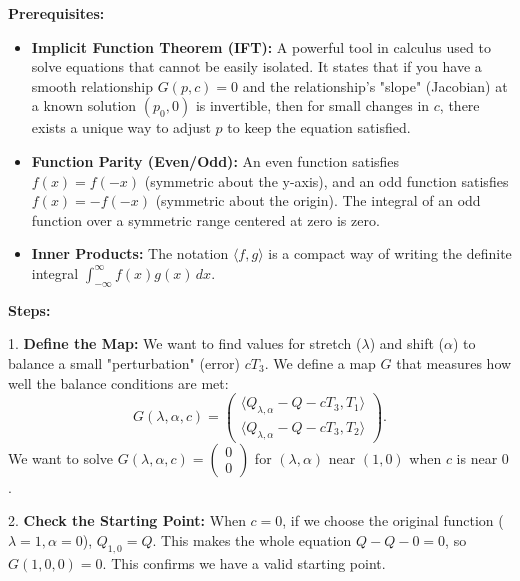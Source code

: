 \begin{solution}
\textbf{Prerequisites:}
\begin{itemize}
    \item \textbf{Implicit Function Theorem (IFT):} A powerful tool in calculus used to solve equations that cannot be easily isolated. It states that if you have a smooth relationship $G(p, c) = 0$ and the relationship's "slope" (Jacobian) at a known solution $(p_0, 0)$ is invertible, then for small changes in $c$, there exists a unique way to adjust $p$ to keep the equation satisfied.
    \item \textbf{Function Parity (Even/Odd):} An even function satisfies $f(x) = f(-x)$ (symmetric about the y-axis), and an odd function satisfies $f(x) = -f(-x)$ (symmetric about the origin). The integral of an odd function over a symmetric range centered at zero is zero.
    \item \textbf{Inner Products:} The notation $\langle f, g \rangle$ is a compact way of writing the definite integral $\int_{-\infty}^{\infty} f(x)g(x) \, dx$.
\end{itemize}

\textbf{Steps:}

\par\vspace{\baselineskip}
1. \textbf{Define the Map:} We want to find values for stretch ($\lambda$) and shift ($\alpha$) to balance a small "perturbation" (error) $cT_3$. We define a map $G$ that measures how well the balance conditions are met:
\[
G(\lambda, \alpha, c) = \begin{pmatrix} \langle Q_{\lambda,\alpha} - Q - cT_3, T_1 \rangle \\ \langle Q_{\lambda,\alpha} - Q - cT_3, T_2 \rangle \end{pmatrix}.
\]
We want to solve $G(\lambda, \alpha, c) = \begin{pmatrix} 0 \\ 0 \end{pmatrix}$ for $(\lambda, \alpha)$ near $(1, 0)$ when $c$ is near $0$.

\par\vspace{\baselineskip}
2. \textbf{Check the Starting Point:} When $c=0$, if we choose the original function ($\lambda=1, \alpha=0$), $Q_{1,0} = Q$. This makes the whole equation $Q - Q - 0 = 0$, so $G(1, 0, 0) = 0$. This confirms we have a valid starting point.


\end{solution}

